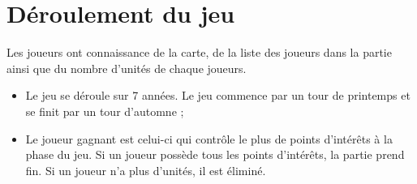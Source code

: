 \section{Déroulement du jeu}
	Les joueurs ont connaissance de la carte, de la liste des joueurs dans la partie ainsi que du nombre d'unités de chaque joueurs.
	\begin{itemize}
		\item Le jeu se déroule sur 7 années. Le jeu commence par un tour de printemps et se finit par un tour d'automne ;
		\item Le joueur gagnant est celui-ci qui contrôle le plus de points d'intérêts à la phase du jeu. Si un joueur possède tous les points d'intérêts, la partie prend fin. Si un joueur n'a plus d'unités, il est éliminé.
	\end{itemize}

